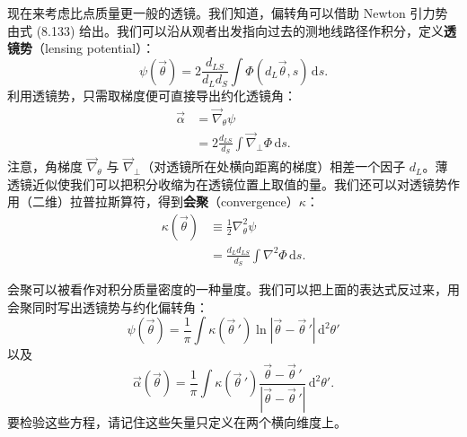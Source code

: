现在来考虑比点质量更一般的透镜。我们知道，偏转角可以借助 Newton 引力势由式 (8.133) 给出。我们可以沿从观者出发指向过去的测地线路径作积分，定义\textbf{透镜势}（lensing potential）：
\begin{equation*}
\psi(\vec{\theta}) = 2\frac{d_{LS}}{d_L d_S}\int \Phi(d_L\vec{\theta},s)\,\mathrm{d}s.
\tag{8.140}
\end{equation*}
利用透镜势，只需取梯度便可直接导出约化透镜角：
\begin{align*}
\vec{\alpha} &= \vec{\nabla}_{\theta}\psi\\
&= 2\frac{d_{LS}}{d_S}\int \vec{\nabla}_{\perp}\Phi\,\mathrm{d}s.
\tag{8.141}
\end{align*}
注意，角梯度 $\vec{\nabla}_{\theta}$ 与 $\vec{\nabla}_{\perp}$（对透镜所在处横向距离的梯度）相差一个因子 $d_L$。薄透镜近似使我们可以把积分收缩为在透镜位置上取值的量。我们还可以对透镜势作用（二维）拉普拉斯算符，得到\textbf{会聚}（convergence）$\kappa$：
\begin{align*}
\kappa(\vec{\theta}) &\equiv \frac{1}{2}\nabla_{\theta}^{2}\psi\\
&= \frac{d_L d_{LS}}{d_S}\int \nabla^{2}\Phi\,\mathrm{d}s.
\tag{8.142}
\end{align*}

会聚可以被看作对积分质量密度的一种量度。我们可以把上面的表达式反过来，用会聚同时写出透镜势与约化偏转角：
\begin{equation*}
\psi(\vec{\theta}) = \frac{1}{\pi}\int \kappa(\vec{\theta}\,')\ln|\vec{\theta}-\vec{\theta}\,'|\,\mathrm{d}^{2}\theta'
\tag{8.143}
\end{equation*}
以及
\begin{equation*}
\vec{\alpha}(\vec{\theta}) = \frac{1}{\pi}\int \kappa(\vec{\theta}\,')\frac{\vec{\theta}-\vec{\theta}\,'}{|\vec{\theta}-\vec{\theta}\,'|}\,\mathrm{d}^{2}\theta'.
\tag{8.144}
\end{equation*}
要检验这些方程，请记住这些矢量只定义在两个横向维度上。

